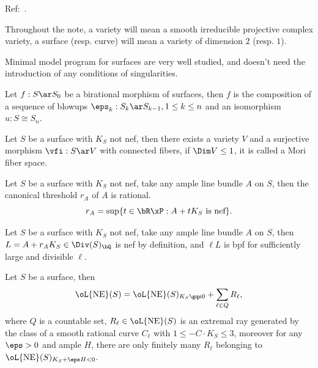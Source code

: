 \documentclass[a4paper, twoside]{article}
\begin{document}
\confighead{}{}{}



Ref:~\cite{Ciliberto2020}.

\begin{stp}
	Throughout the note, a variety will mean a smooth irreducible projective complex variety, a surface (resp. curve) will mean a variety of dimension $2$ (resp. $1$).
\end{stp}

Minimal model program for surfaces are very well studied, and doesn't need the introduction of any conditions of singularities.

\begin{thm}
	Let $f:S\ar S_{0}$ be a birational morphism of surfaces, then $f$ is the composition of a sequence of blowups $\eps_{k}:S_{k}\ar S_{k-1},1\leq k\leq n$ and an isomorphism $u:S\cong S_{n}$.
\end{thm}

\begin{thm}
	Let $S$ be a surface with $K_{S}$ not nef, then there exists a variety $V$ and a surjective morphism $\vfi:S\ar V$ with connected fibers, if $\Dim V\leq1$, it is called a Mori fiber space.
\end{thm}

\begin{thm}
	Let $S$ be a surface with $K_{S}$ not nef, take any ample line bundle $A$ on $S$, then the canonical threshold $r_{A}$ of $A$ is rational.
	\[
		r_{A}=\sup\{t\in\bR\xP: \text{$A+tK_{S}$ is nef}\}.
	\]
\end{thm}

\begin{thm}
	Let $S$ be a surface with $K_{S}$ not nef, take any ample line bundle $A$ on $S$, then $L=A+r_{A}K_{S}\in\Div(S)_{\bQ}$ is nef by definition, and $\ell L$ is bpf for sufficiently large and divisible $\ell$.
\end{thm}

\begin{thm}
	Let $S$ be a surface, then
	\[
		\oL{\mathrm{NE}}(S)=\oL{\mathrm{NE}}(S)_{K_{S}\gqs0}+\sum_{\ell\in Q}R_{\ell},
	\]
	where $Q$ is a countable set, $R_{\ell}\in\oL{\mathrm{NE}}(S)$ is an extremal ray generated by the class of a smooth rational curve $C_{\ell}$ with $1\leq-C\cdot K_{S}\leq3$, moreover for any $\eps>0$ and ample $H$, there are only finitely many $R_{\ell}$ belonging to $\oL{\mathrm{NE}}(S)_{K_{S}+\eps H<0}$.
\end{thm}
\end{document}
